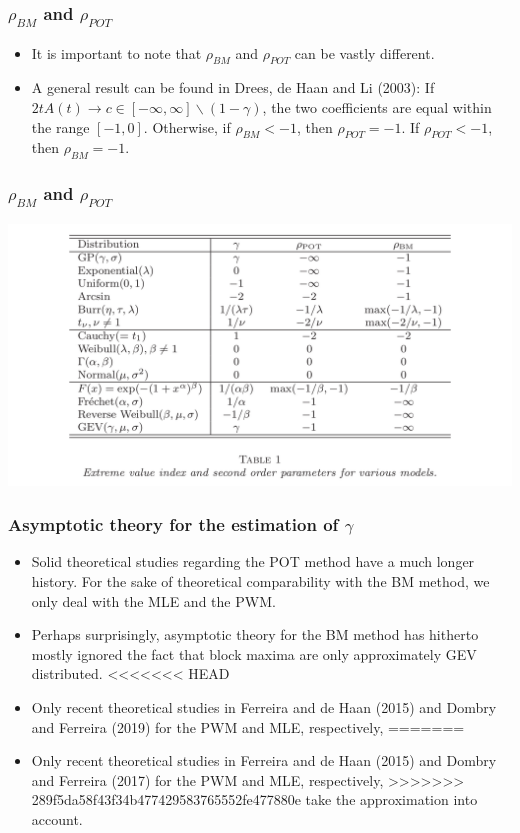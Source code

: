 \documentclass{beamer}
\begin{document}
\begin{frame}
    \frametitle{$\rho_{BM}$ and $\rho_{POT}$}
    \begin{itemize}
        \item It is important to note that $\rho_{BM}$ and $\rho_{POT}$ can be vastly different. 
        \item A general result can be found in Drees, de Haan and Li (2003): If $2tA(t)\to c \in [-\infty,\infty]\backslash(1-\gamma)$, the two coefficients are equal within the range $[-1,0]$. Otherwise, if $\rho_{BM}<-1$, then $\rho_{POT}=-1$. If $\rho_{POT}<-1$, then $\rho_{BM}=-1$.
    \end{itemize}
    

    

\end{frame}

\begin{frame}
    \frametitle{$\rho_{BM}$ and $\rho_{POT}$}

    \includegraphics[width=1\textwidth]{fig1.png}

\end{frame}

\begin{frame}
    \frametitle{Asymptotic theory for the estimation of $\gamma$}
\begin{itemize}
    \item Solid theoretical studies regarding the POT method have a much longer history. For the sake of theoretical comparability with the BM
    method, we only deal with the MLE and the PWM.
    \item Perhaps surprisingly, asymptotic theory for the BM method has hitherto mostly ignored the fact that
    block maxima are only {\color{red} approximately} GEV distributed.
<<<<<<< HEAD
    \item Only recent theoretical studies in Ferreira and de Haan (2015) and Dombry and Ferreira (2019) for the PWM and MLE, respectively,
=======
    \item Only recent theoretical studies in Ferreira and de Haan (2015) and Dombry and Ferreira (2017) for the PWM and MLE, respectively,
>>>>>>> 289f5da58f43f34b477429583765552fe477880e
    take the approximation into account.
\end{itemize}
\end{frame}
\end{document}
